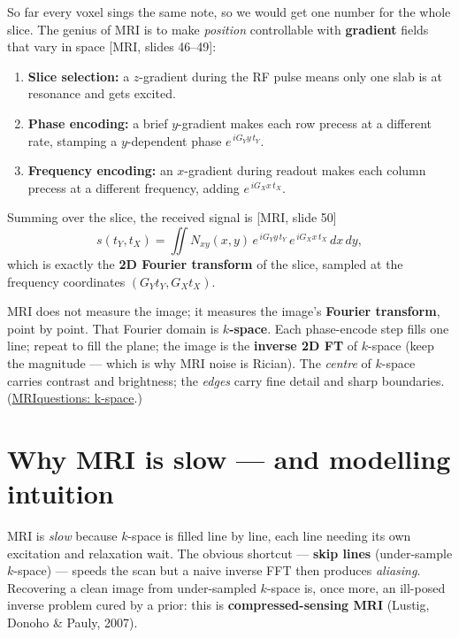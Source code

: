 \documentclass[11pt]{article}
\newcommand{\deck}[1]{\textsf{\small[#1]}}
\begin{document}
So far every voxel sings the same note, so we would get one number for the whole
slice. The genius of MRI is to make \emph{position} controllable with
\textbf{gradient} fields that vary in space \deck{MRI, slides 46--49}:
\begin{enumerate}[leftmargin=*,nosep]
  \item \textbf{Slice selection:} a $z$-gradient during the RF pulse means only
  one slab is at resonance and gets excited.
  \item \textbf{Phase encoding:} a brief $y$-gradient makes each row precess at a
  different rate, stamping a $y$-dependent phase $e^{\,iG_Y y\,t_Y}$.
  \item \textbf{Frequency encoding:} an $x$-gradient during readout makes each
  column precess at a different frequency, adding $e^{\,iG_X x\,t_X}$.
\end{enumerate}
Summing over the slice, the received signal is \deck{MRI, slide 50}
\[
s(t_Y,t_X)=\iint N_{xy}(x,y)\,e^{\,iG_Y y\,t_Y}\,e^{\,iG_X x\,t_X}\,dx\,dy,
\]
which is exactly the \textbf{2D Fourier transform} of the slice, sampled at the
frequency coordinates $(G_Y t_Y, G_X t_X)$.

\begin{keybox}[$k$-space]
MRI does not measure the image; it measures the image's \textbf{Fourier
transform}, point by point. That Fourier domain is \textbf{$k$-space}. Each
phase-encode step fills one line; repeat to fill the plane; the image is the
\textbf{inverse 2D FT} of $k$-space (keep the magnitude --- which is why MRI
noise is Rician). The \emph{centre} of $k$-space carries contrast and
brightness; the \emph{edges} carry fine detail and sharp boundaries.
(\href{https://mriquestions.com/what-is-k-space.html}{MRIquestions: k-space}.)
\end{keybox}

\section{Why MRI is slow --- and modelling intuition}

MRI is \emph{slow} because $k$-space is filled line by line, each line needing
its own excitation and relaxation wait. The obvious shortcut --- \textbf{skip
lines} (under-sample $k$-space) --- speeds the scan but a naive inverse FFT then
produces \emph{aliasing}. Recovering a clean image from under-sampled $k$-space
is, once more, an ill-posed inverse problem cured by a prior: this is
\textbf{compressed-sensing MRI} (Lustig, Donoho \& Pauly, 2007).
\end{document}

